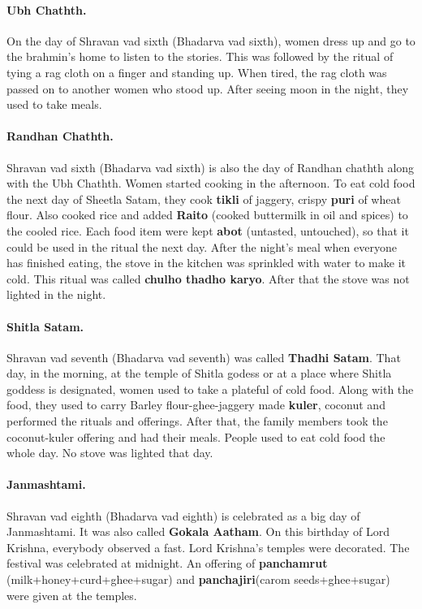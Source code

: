 \paragraph{Ubh Chathth.} On the day of Shravan vad sixth (Bhadarva vad sixth),
women dress up and go to the brahmin's home to listen to  the stories. This was
followed by the ritual of tying a rag cloth on a finger and standing up. When
tired, the rag cloth was passed on to another women who stood up. After seeing
moon in the night, they used to take meals.
\paragraph{Randhan Chathth.} Shravan vad sixth (Bhadarva vad sixth) is also the
day of Randhan chathth along with the Ubh Chathth. Women started cooking in the
afternoon. To eat cold food the next day of Sheetla Satam, they cook
\textbf{tikli} of jaggery, crispy \textbf{puri} of wheat flour. Also cooked rice
and added \textbf{Raito} (cooked buttermilk in oil and spices) to the cooled
rice. Each food item were kept \textbf{abot} (untasted, untouched), so that it
could be used in the ritual the next day. After the night's meal when everyone
has finished eating, the stove in the kitchen was sprinkled with water to make
it cold. This ritual was called \textbf{chulho thadho karyo}. After that the
stove was not lighted in the night.
\paragraph{Shitla Satam.} Shravan vad seventh (Bhadarva vad seventh) was called
\textbf{Thadhi Satam}. That day, in the morning, at the temple of Shitla godess
or at a place where Shitla goddess is designated, women used to take a plateful
of cold food. Along with the food, they used to carry Barley flour-ghee-jaggery
made \textbf{kuler}, coconut and performed the rituals and offerings. After
that, the family members took the coconut-kuler offering and had their meals.
People used to eat cold food the whole day. No stove was lighted that day.  
\paragraph{Janmashtami.} Shravan vad eighth (Bhadarva vad eighth) is celebrated
as a big day of Janmashtami. It was also called \textbf{Gokala Aatham}. On this
birthday of Lord Krishna, everybody observed a fast. Lord Krishna's temples were
decorated. The festival was celebrated at midnight. An offering of
\textbf{panchamrut} (milk+honey+curd+ghee+sugar) and \textbf{panchajiri}(carom
seeds+ghee+sugar) were given at the temples.
